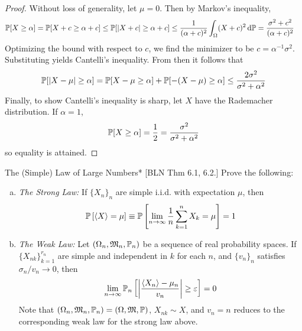 \begin{proof}
    Without loss of generality, let \(\mu = 0\). Then by Markov's inequality,
    \begin{align*}
        \mathbb{P}[X \geq \alpha]
        &= \mathbb{P}[X + c \geq \alpha + c]
        \leq \mathbb{P}[|X + c| \geq \alpha + c]
        \leq \frac{1}{(\alpha + c)^2} \int_{\Omega} (X + c)^2 \, \mathrm{d}\mathbb{P}
        = \frac{\sigma^2 + c^2}{(\alpha + c)^2}
    \end{align*}
    Optimizing the bound with respect to \(c\), we find the minimizer to be \(c = \alpha^{-1} \sigma^2\). Substituting yields Cantelli's inequality. From then it follows that
    \[
        \mathbb{P}[|X - \mu| \geq \alpha]
        = \mathbb{P}[X - \mu \geq \alpha] + \mathbb{P}[-(X - \mu) \geq \alpha]
        \leq \frac{2\sigma^2}{\sigma^2 + \alpha^2}
    \]
    Finally, to show Cantelli's inequality is sharp, let \(X\) have the Rademacher distribution. If \(\alpha = 1\),
    \[
        \mathbb{P}[X \geq \alpha] = \frac{1}{2} = \frac{\sigma^2}{\sigma^2 + \alpha^2}
    \]
    so equality is attained.
\end{proof}


\begin{problem}{The (Simple) Law of Large Numbers}*
    [BLN Thm 6.1, 6.2.] Prove the following:
    \begin{enumerate}[(a)]
        \itemsep0em
        \item \emph{The Strong Law:} If \(\{X_n\}_n\) are simple i.i.d. with expectation \(\mu\), then
        \[
            \bb{P}\left[\ev{X} = \mu\right]
            \equiv \bb{P}\left[ \lim_{n \to \infty} \frac{1}{n} \sum_{k=1}^n X_k = \mu \right]
            = 1
        \]
        \item \emph{The Weak Law:} Let \((\Omega_n, \mathfrak{M}_n, \mathbb{P}_n)\) be a sequence of real probability spaces. If \(\{X_{nk}\}_{k=1}^{r_n}\) are simple and independent in \(k\) for each \(n\), and \(\{v_n\}_n\) satisfies \(\sigma_n / v_n \to 0\), then
        \[
            \lim_{n \to \infty} \bb{P}_n \left[ \left| \frac{\ev{X_n} - \mu_n}{v_n} \right| \geq \varepsilon \right] = 0
        \]
        Note that \((\Omega_n, \mathfrak{M}_n, \mathbb{P}_n) = (\Omega, \mathfrak{M}, \mathbb{P})\), \(X_{nk} \sim X\), and \(v_n = n\) reduces to the corresponding weak law for the strong law above. 
    \end{enumerate}
\end{problem}

